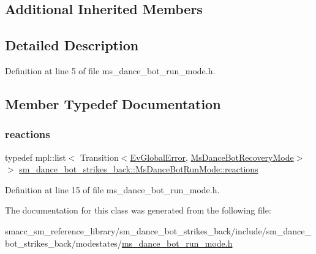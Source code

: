 \subsection*{Additional Inherited Members}


\subsection{Detailed Description}


Definition at line 5 of file ms\+\_\+dance\+\_\+bot\+\_\+run\+\_\+mode.\+h.



\subsection{Member Typedef Documentation}
\mbox{\label{classsm__dance__bot__strikes__back_1_1MsDanceBotRunMode_a49adec1999b0fa5c7b67d8b503cae711}} 
\subsubsection{\texorpdfstring{reactions}{reactions}}
{\footnotesize\ttfamily typedef mpl\+::list$<$ Transition$<$\hyperlink{structsm__dance__bot__strikes__back_1_1EvGlobalError}{Ev\+Global\+Error}, \hyperlink{classsm__dance__bot__strikes__back_1_1MsDanceBotRecoveryMode}{Ms\+Dance\+Bot\+Recovery\+Mode}$>$ $>$ \hyperlink{classsm__dance__bot__strikes__back_1_1MsDanceBotRunMode_a49adec1999b0fa5c7b67d8b503cae711}{sm\+\_\+dance\+\_\+bot\+\_\+strikes\+\_\+back\+::\+Ms\+Dance\+Bot\+Run\+Mode\+::reactions}}



Definition at line 15 of file ms\+\_\+dance\+\_\+bot\+\_\+run\+\_\+mode.\+h.



The documentation for this class was generated from the following file\+:\begin{DoxyCompactItemize}
\item 
smacc\+\_\+sm\+\_\+reference\+\_\+library/sm\+\_\+dance\+\_\+bot\+\_\+strikes\+\_\+back/include/sm\+\_\+dance\+\_\+bot\+\_\+strikes\+\_\+back/modestates/\hyperlink{sm__dance__bot__strikes__back_2include_2sm__dance__bot__strikes__back_2modestates_2ms__dance__bot__run__mode_8h}{ms\+\_\+dance\+\_\+bot\+\_\+run\+\_\+mode.\+h}\end{DoxyCompactItemize}
